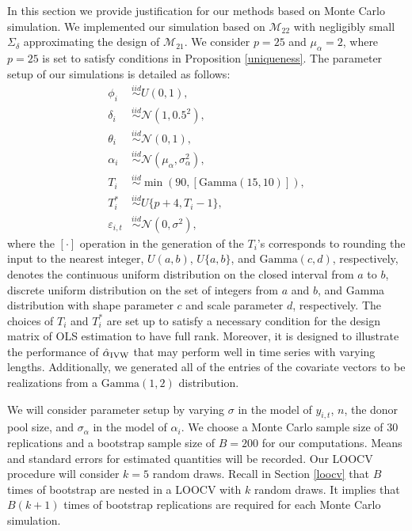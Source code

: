 \documentclass[11pt,3p,review,authoryear]{elsarticle}
\newcommand{\simiid}{\stackrel{iid}{\sim}} %
\def\mrm#1{\mathrm{#1}} %
\def\normal#1#2{\mathcal{N}(#1,#2)} %
\def\mc#1{\mathcal{#1}} %
\theoremstyle{definition}
\begin{document}
In this section we provide justification for our methods based on Monte Carlo simulation. We implemented our simulation based on $\mc{M}_{22}$ with negligibly small $\Sigma_{\delta}$ approximating the design of $\mathcal{M}_{21}$.  We consider $p=25$ and $\mu_{\alpha}=2$, where $p = 25$ is set to satisfy conditions in Proposition \ref{uniqueness}. The parameter setup of our simulations is detailed as follows: 
\begin{align*}
  \phi_i &\simiid U(0,1),	\\
  \delta_i &\simiid  \normal{1}{0.5^2}, \\
  \theta_i &\simiid \normal{0}{1}, \\
  \alpha_i &\simiid \normal{\mu_\alpha}{\sigma_{\alpha}^2}, \\
  T_i &\simiid \min\left(90, [\text{Gamma}(15,10)]\right), \\
  T_i^* &\simiid U\{p+4, T_i-1\}, \\
  \varepsilon_{i,t} &\simiid \normal{0}{\sigma^2},
\end{align*}
where the $[\cdot]$ operation in the generation of the $T_i$'s corresponds to rounding the input to the nearest integer, $U(a,b)$, $U\{a,b\}$, and $\mrm{Gamma}(c,d)$, respectively,  denotes the continuous uniform distribution on the closed interval from $a$ to $b$, discrete uniform distribution on the set of integers from $a$ and $b$, and Gamma distribution with shape parameter $c$ and scale parameter $d$, respectively. The choices of $T_i$ and $T_i^*$ are set up to satisfy a necessary condition for the design matrix of OLS estimation to have full rank. Moreover, it is  designed to illustrate the performance of $\hat{\alpha}_{\rm IVW}$ that may perform well in time series with varying lengths. Additionally, we generated all of the entries of the covariate vectors to be realizations from a $\text{Gamma}(1,2)$ distribution. 

We will consider parameter setup by varying $\sigma$ in the model of $y_{i,t}$, $n$, the donor pool size, and $\sigma_{\alpha}$ in the model of $\alpha_i$. We choose a Monte Carlo sample size of $30$ replications and a bootstrap sample size of $B = 200$ for our computations. Means and standard errors for estimated quantities will be recorded. Our LOOCV procedure will consider $k=5$ random draws. Recall in Section \ref{loocv} that $B$ times of bootstrap are nested in a LOOCV with $k$ random draws. It implies that $B(k+1)$ times of bootstrap replications are required for each Monte Carlo simulation.
\end{document}
